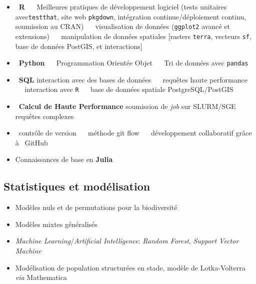 \documentclass[10pt,a4paper,]{article}
\providecommand{\tightlist}{%
  \setlength{\itemsep}{0pt}\setlength{\parskip}{0pt}}
\begin{document}
\begin{itemize}
\tightlist
\item
  \faRProject~\textbf{R} ~\textbullet~ Meilleures pratiques de
  développement logiciel (tests unitaires avec\texttt{testthat}, site
  web \texttt{pkgdown}, intégration continue/déploiement continu,
  soumission au CRAN) ~\textbullet~ visualisation de données
  (\texttt{ggplot2} avancé et extensions) ~\textbullet~ manipulation de
  données spatiales {[}rasters \texttt{terra}, vecteurs \texttt{sf},
  base de données PostGIS, et interactions{]}
\item
  \faPython~\textbf{Python} ~\textbullet~ Programmation Orientée Objet
  ~\textbullet~ Tri de données avec \texttt{pandas}
\item
  \faDatabase~\textbf{SQL} interaction avec des bases de données
  ~\textbullet~ requêtes haute performance ~\textbullet~ interaction
  avec \texttt{R} ~\textbullet~ base de données spatiale
  PostgreSQL/PostGIS
\item
  \faServer~\textbf{Calcul de Haute Performance} soumission de
  \emph{job} sur SLURM/SGE ~\textbullet~ requêtes complexes
\item
  \faGit~contrôle de version ~\textbullet~ méthode git flow
  ~\textbullet~ développement collaboratif grâce à \faGithub~GitHub
\item
  Connaissances de base en \textbf{Julia}
\end{itemize}

\hypertarget{statistiques-et-moduxe9lisation}{%
\subsection{Statistiques et
modélisation}\label{statistiques-et-moduxe9lisation}}

\begin{itemize}
\tightlist
\item
  Modèles nuls et de permutations pour la biodiversité
\item
  Modèles mixtes généralisés
\item
  \emph{Machine Learning}/\emph{Artificial Intelligence}: \emph{Random
  Forest}, \emph{Support Vector Machine}
\item
  Modélisation de population structurées en stade, modèle de
  Lotka-Volterra \emph{via} Mathematica
\end{itemize}
\end{document}
